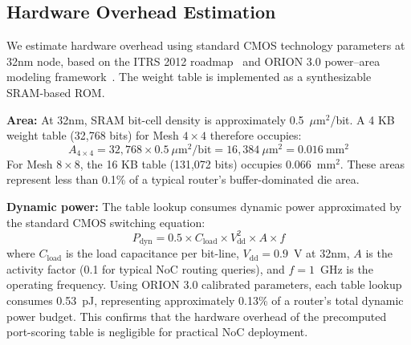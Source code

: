 \subsection{Hardware Overhead Estimation}
\label{sec:hardware-overhead}

We estimate hardware overhead using standard CMOS technology parameters at 32nm node, based on the ITRS 2012 roadmap~\cite{itrs2012} and ORION 3.0 power--area modeling framework~\cite{orion3}. The weight table is implemented as a synthesizable SRAM-based ROM.

\textbf{Area:} At 32nm, SRAM bit-cell density is approximately 0.5~$\mu$m$^2$/bit. A 4 KB weight table (32,768 bits) for Mesh $4\times4$ therefore occupies:
\begin{equation}
A_{4\times4} = 32,768 \times 0.5~\mu\text{m}^2/\text{bit} = 16,384~\mu\text{m}^2 = 0.016~\text{mm}^2
\end{equation}
For Mesh $8\times8$, the 16 KB table (131,072 bits) occupies 0.066~mm$^2$. These areas represent less than 0.1\% of a typical router's buffer-dominated die area.

\textbf{Dynamic power:} The table lookup consumes dynamic power approximated by the standard CMOS switching equation:
\begin{equation}
P_{\text{dyn}} = 0.5 \times C_{\text{load}} \times V_{\text{dd}}^2 \times A \times f
\end{equation}
where $C_{\text{load}}$ is the load capacitance per bit-line, $V_{\text{dd}} = 0.9$~V at 32nm, $A$ is the activity factor (0.1 for typical NoC routing queries), and $f = 1$~GHz is the operating frequency. Using ORION 3.0 calibrated parameters, each table lookup consumes 0.53~pJ, representing approximately 0.13\% of a router's total dynamic power budget. This confirms that the hardware overhead of the precomputed port-scoring table is negligible for practical NoC deployment.
